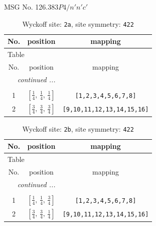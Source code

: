 \documentclass[fleqn,8pt]{jsarticle}
\begin{document}
\setcounter{MaxMatrixCols}{32}

\renewcommand{\tablename}{Table~}
\renewcommand{\figurename}{Figure~}
\begin{center}
\LARGE
MSG No. 126.383\quad$P4/n'n'c'$
\end{center}
\renewcommand{\arraystretch}{1.2}
\begin{longtable}{ccc}
\caption{Wyckoff site: {\tt 2a}, site symmetry: {\tt 422}}
 \\
 \hline \hline
No. & position & mapping \\ \hline \endfirsthead

\multicolumn{2}{l}{\tablename\ \thetable{}} \\
 \hline \hline
No. & position & mapping \\ \hline \endhead

 \hline \hline
\multicolumn{2}{r}{\footnotesize\it continued ...} \\ \endfoot

 \hline \hline
\multicolumn{2}{r}{} \\ \endlastfoot

1 & $\left[ \frac{1}{4},\, \frac{1}{4},\, \frac{1}{4} \right]$ & {\tt [1,2,3,4,5,6,7,8]} \\ \hline
2 & $\left[ \frac{3}{4},\, \frac{3}{4},\, \frac{3}{4} \right]$ & {\tt [9,10,11,12,13,14,15,16]} \\
\end{longtable}
\renewcommand{\arraystretch}{1.2}
\begin{longtable}{ccc}
\caption{Wyckoff site: {\tt 2b}, site symmetry: {\tt 422}}
 \\
 \hline \hline
No. & position & mapping \\ \hline \endfirsthead

\multicolumn{2}{l}{\tablename\ \thetable{}} \\
 \hline \hline
No. & position & mapping \\ \hline \endhead

 \hline \hline
\multicolumn{2}{r}{\footnotesize\it continued ...} \\ \endfoot

 \hline \hline
\multicolumn{2}{r}{} \\ \endlastfoot

1 & $\left[ \frac{1}{4},\, \frac{1}{4},\, \frac{3}{4} \right]$ & {\tt [1,2,3,4,5,6,7,8]} \\ \hline
2 & $\left[ \frac{3}{4},\, \frac{3}{4},\, \frac{1}{4} \right]$ & {\tt [9,10,11,12,13,14,15,16]} \\
\end{longtable}
\end{document}

